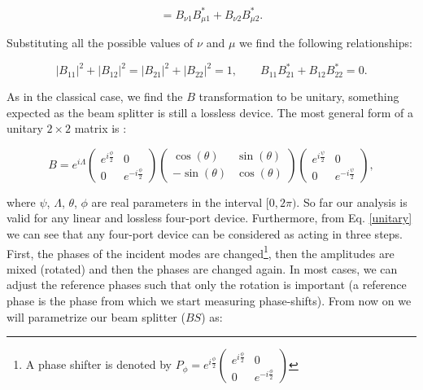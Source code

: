 \documentclass[12pt]{book}
\begin{document}
\begin{equation}
   [\mathbf{a}'_{\nu},\mathbf{a}'^{\dagger}_{\mu}]=B_{\nu 1} B_{\mu 1}^{*}+B_{\nu 2} B_{\mu 2}^{*} .
\end{equation}

Substituting all the possible values of $\nu$ and $\mu$ we find the following relationships:

\begin{equation}
|B_{11}|^{2}+|B_{12}|^{2}=|B_{21}|^{2}+|B_{22}|^{2}=1 ,\qquad B_{11} B_{21}^{*}+B_{12} B_{22}^{*}=0.
\end{equation}

As in the classical case, we find the $B$ transformation to be unitary, something expected as the beam splitter is still a lossless device. The most general form of a unitary $2\times2$ matrix is \cite{leonhardt}:


\begin{equation}
B=e^{i\Lambda} \begin{pmatrix} e^{i\frac{\phi}{2}} & 0 \\ 0 & e^{-i\frac{\phi}{2}} \end{pmatrix} \begin{pmatrix} \cos(\theta) &  \sin(\theta) \\ - \sin(\theta) & \cos(\theta) \end{pmatrix} \begin{pmatrix} e^{i\frac{\psi}{2}} & 0 \\ 0 & e^{-i\frac{\psi}{2}} \end{pmatrix} \label{unitary},
\end{equation}

where $\psi$, $\Lambda$, $\theta$, $\phi$ are real parameters in the interval $[0,2\pi)$. So far our analysis is valid for any linear and lossless four-port device. Furthermore, from Eq. \ref{unitary} we can see that any four-port device can be considered as acting in three steps. First, the phases of the incident modes are changed\footnote{A phase shifter is denoted by $P_{\phi}=e^{i \frac{\phi}{2}}\begin{pmatrix}e^{i \frac{\phi}{2}} & 0 \\0 & e^{-i \frac{\phi}{2}} \end{pmatrix}$}, then the amplitudes are mixed (rotated) and then the phases are changed again. In most cases, we can adjust the reference phases such that only the rotation is important (a reference phase is the phase from which we start measuring phase-shifts). From now on we will parametrize our beam splitter ($BS$) as:
\end{document}
